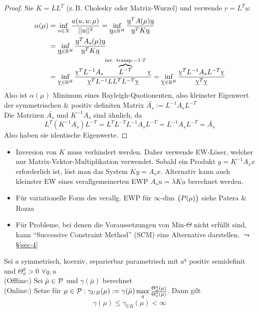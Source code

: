 \begin{proof}
	Sie $K = L L^T$ (z.\,B. Cholesky oder Matrix-Wurzel) und verwende $\underbar v = L^T \underbar u$:
	\begin{align*}
		\alpha (\mu) &= \inf\limits_{u \in X} \frac{a(u,u;\mu)}{||u||^2} = \inf\limits_{\underbar u \in \mathbb{R}^H} \frac{\underbar u^T A(\mu) \underbar u}{\underbar u^T K \underbar u} \\
		&= \inf\limits_{\underbar u \in \mathbb{R}^H} \frac{\underbar u^T A_s(\mu) \underbar u}{\underbar u^T K \underbar u} \\
		&= \inf\limits_{\underbar v \in \mathbb{R}^H} \frac{\underbar v^T L^{-1} A_s \overbrace{L^{-T}}^{\text{inv. transp.} -1 \cdot T} \underbar v}{\underbar v^T L^{-1} L L^T L^{-T} \underbar v} = \inf\limits_{\underbar v \in \mathbb{R}^H} \frac{\underbar v^T L^{-1} A_s L^{-T} \underbar v}{\underbar v^T \underbar v}
	\end{align*}
	Also ist $\alpha(\mu)$ Minimum eines Rayleigh-Quotionenten, also kleinster Eigenwert der symmetrischen \& positiv definiten Matrix $\bar{A_s} := L^{-1} A_s L^{-T}$ \\
	Die Matrizen $\bar{A_s}$ und $K^{-1} A_s$ sind ähnlich, da 
	\[
		L^T(K^{-1}A_s)L^{-T} = L^T L^{-T}L^{-1}A_sL^{-T} = L^{-1}A_sL^{-T} = \bar{A_s}
	\]
	Also haben sie identische Eigenwerte.
\end{proof}

\begin{bem} \beginwithlistbem
	\begin{itemize}
		\item Inversion von $K$ muss verhindert werden. Daher verwende EW-Löser, welcher nur Matrix-Vektor-Multiplikation verwendet. Sobald ein Produkt $y=K^{-1}A_s x$ erforderlich ist, löst man das System $Ky = A_s x$. Alternativ kann auch kleinster EW eines verallgemeinerten EWP $A_s \underbar u = \lambda K \underbar u$ berechnet werden.
		\item Für variationelle Form des verallg. EWP für $\infty$-dim $\big(P(\mu)\big)$ siehe Patera \& Rozza
		\item Für Probleme, bei denen die Voraussetzungen von Min-$\Theta$ nicht erfüllt sind, kann ``Successive Constraint Method'' (SCM) eine Alternative darstellen.  $\leadsto$ §\ref{sec-4}
	\end{itemize}
\end{bem}

\begin{satz}
	Sei $a$ symmetrisch, koerziv, separierbar parametrisch mit $a^q$ positiv semidefinit und $\Theta_a^q > 0 \, \, \forall q,u$ \\
	(Offline:) Sei $\bar{\mu} \in \mathcal{P}$ und $\gamma(\bar{\mu})$ berechnet \\
	(Online:) Setze für $\mu \in \mathcal{P}: \gamma_{UB}(\mu) := \gamma(\bar{\mu}) \max\limits_q \frac{\Theta_a^q(\mu)}{\Theta_a^q(\bar{\mu})}$. Dann gilt 
	\[
		\gamma(\mu) \leq \gamma_{UB} (\mu) < \infty
	\]
\end{satz}

